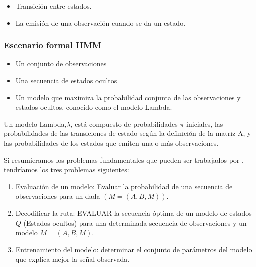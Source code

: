 \begin{itemize}
	\menorEspacioItemize
	\item Transición entre estados.
	\item La emisión de una observación cuando se da un estado.
\end{itemize}


\subsubsection{Escenario formal HMM}

\begin{itemize}
	\menorEspacioItemize
	\item Un conjunto de observaciones
	\item Una secuencia de estados ocultos
	\item Un modelo que maximiza la probabilidad conjunta de las observaciones y estados ocultos, conocido como el modelo Lambda.
\end{itemize}


Un modelo Lambda,$\lambda$, está compuesto de probabilidades $\pi$ iniciales, las probabilidades de las transiciones de estado según la definición de la matriz A, y las probabilidades de los estados que emiten una o más observaciones.









 


Si resumieramos los problemas fundamentales que pueden ser trabajados por \HMM, tendríamos los tres problemas siguientes:

\begin{enumerate}
	\menorEspacioItemize
	\item Evaluación de un modelo: Evaluar la probabilidad de una secuencia de observaciones para un \HMM dada  $(M = (A, B, M)).$
	\item Decodificar la ruta:  EVALUAR la secuencia óptima de un modelo de estados $Q$ (Estados ocultos) para una determinada secuencia de observaciones y un modelo \HMM $M = (A, B, M).$
	\item  Entrenamiento del modelo:   determinar el conjunto de parámetros del modelo que explica mejor la señal observada.

\end{enumerate}









 













%

